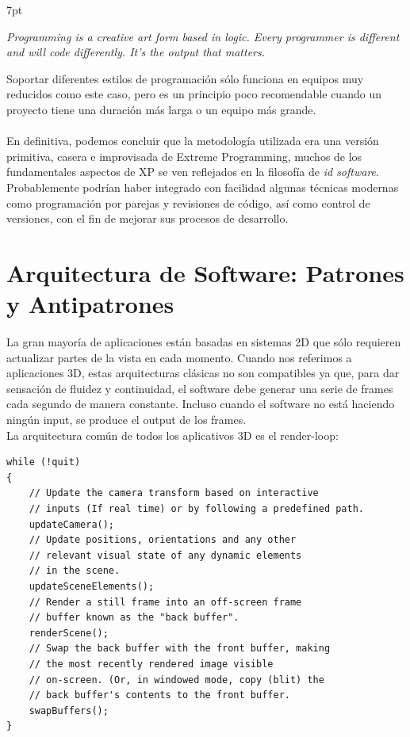 \documentclass[a4paper,12pt]{report}
\newenvironment{formal}{%
	\def\FrameCommand{%
		\hspace{1pt}%
		{\color{darkblue}\vrule width 2pt}%
		{\color{formalshade}\vrule width 4pt}%
		\colorbox{formalshade}%
	}%
	\MakeFramed{\advance\hsize-\width\FrameRestore}%
	\noindent\hspace{-4.55pt}%
	\begin{adjustwidth}{}{7pt}%
		\vspace{2pt}\vspace{2pt}%
	}
	{%
		\vspace{2pt}\end{adjustwidth}\endMakeFramed%
}
\begin{document}
	\begin{formal}
		\textit{Programming is a creative art form based in logic. Every programmer is different and will code differently. It's the output that matters.}
	\end{formal}
	Soportar diferentes estilos de programación sólo funciona en equipos muy reducidos como este caso, pero es un principio poco recomendable cuando un proyecto tiene una duración más larga o un equipo más grande. \\
	\\
	En definitiva, podemos concluir que la metodología utilizada era una versión primitiva, casera e improvisada de Extreme Programming, muchos de los fundamentales aspectos de XP se ven reflejados en la filosofía de \textit{id software}. Probablemente podrían haber integrado con facilidad algunas técnicas modernas como programación por parejas y revisiones de código, así como control de versiones, con el fin de mejorar sus procesos de desarrollo.
	
	
	\section{Arquitectura de Software: Patrones y Antipatrones}

	La gran mayoría de aplicaciones están basadas en sistemas 2D que sólo requieren actualizar partes de la vista en cada momento. Cuando nos referimos a aplicaciones 3D, estas arquitecturas clásicas no son compatibles ya que, para dar sensación de fluidez y continuidad, el software debe generar una serie de frames cada segundo de manera constante. Incluso cuando el software no está haciendo ningún input, se produce el output de los frames. \\
	
	La arquitectura común de todos los aplicativos 3D es el render-loop:
	
	\begin{lstlisting}[style=C, numbers=none]
while (!quit)
{
	// Update the camera transform based on interactive
	// inputs (If real time) or by following a predefined path.
	updateCamera();
	// Update positions, orientations and any other
	// relevant visual state of any dynamic elements
	// in the scene.
	updateSceneElements();
	// Render a still frame into an off-screen frame
	// buffer known as the "back buffer".
	renderScene();
	// Swap the back buffer with the front buffer, making
	// the most recently rendered image visible
	// on-screen. (Or, in windowed mode, copy (blit) the
	// back buffer's contents to the front buffer.
	swapBuffers();
}
\end{lstlisting}
	
\end{document}
